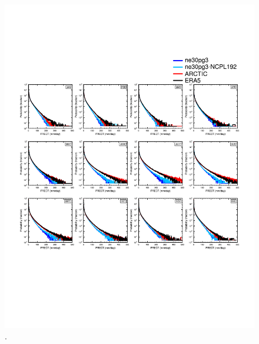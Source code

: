 \documentclass[draft]{agujournal2019}
\begin{document}
\begin{figure}[t]
\begin{center}
         \includegraphics[width=130mm]{figs/temp_composite_ge45N_pdf.pdf}
\end{center}
\caption{.}
\label{fig:comp-pdf}
\end{figure}




\end{document}
